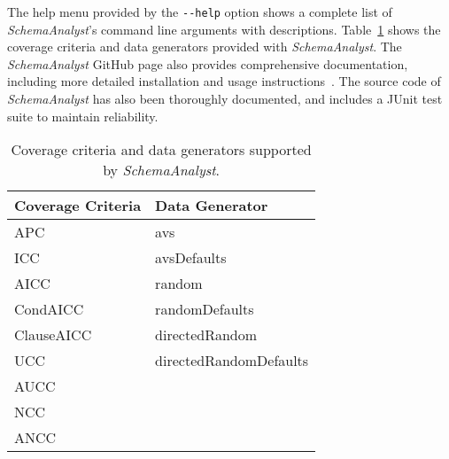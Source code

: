 The help menu provided by the \lstinline{--help} option shows a complete list of \textit{SchemaAnalyst}'s
command line arguments with descriptions. Table~\ref{tab:args} shows the coverage criteria and data generators
provided with \textit{SchemaAnalyst}. The \textit{SchemaAnalyst} GitHub page also provides comprehensive
documentation, including more detailed installation and usage instructions~\cite{tool}. The source code of
\textit{SchemaAnalyst} has also been thoroughly documented, and 
includes a JUnit test suite to maintain reliability.

\begin{table}[]
\centering
\caption{Coverage criteria and data generators supported by \textit{SchemaAnalyst}.}
\label{tab:args}
\begin{tabular}{l|l}
\multicolumn{1}{c|}{Coverage Criteria} & Data Generator         \\ \hline
APC                                    & avs                    \\
ICC                                    & avsDefaults            \\
AICC                                   & random                 \\
CondAICC                               & randomDefaults         \\
ClauseAICC                             & directedRandom         \\
UCC                                    & directedRandomDefaults \\
AUCC                                   &                        \\
NCC                                    &                        \\
ANCC                                   &                       
\end{tabular}
\end{table}
